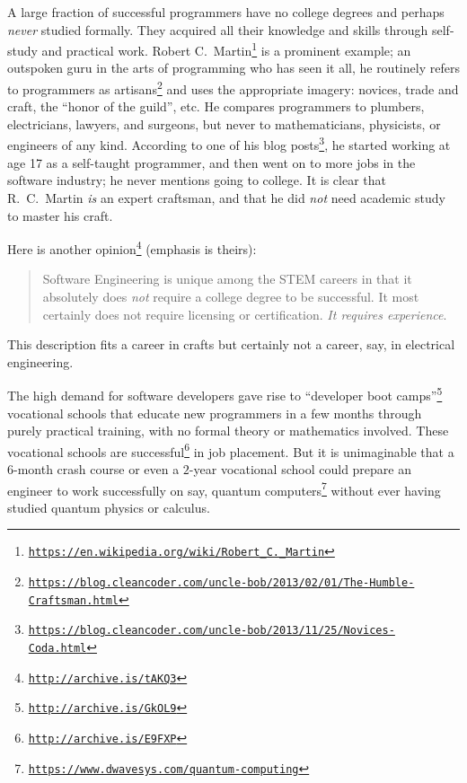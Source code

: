 A large fraction of successful programmers have no college degrees
and perhaps \emph{never} studied formally. They acquired all their
knowledge and skills through self-study and practical work. Robert
C.~Martin\footnote{\texttt{\href{https://en.wikipedia.org/wiki/Robert_C._Martin}{https://en.wikipedia.org/wiki/Robert\_C.\_Martin}}}
is a prominent example; an outspoken guru in the arts of programming
who has seen it all, he routinely refers to programmers as artisans\footnote{\texttt{\href{https://blog.cleancoder.com/uncle-bob/2013/02/01/The-Humble-Craftsman.html}{https://blog.cleancoder.com/uncle-bob/2013/02/01/The-Humble-Craftsman.html}}}
and uses the appropriate imagery: novices, trade and craft, the ``honor
of the guild'', etc. He compares programmers to plumbers, electricians,
lawyers, and surgeons, but never to mathematicians, physicists, or
engineers of any kind. According to one of his blog posts\footnote{\texttt{\href{https://blog.cleancoder.com/uncle-bob/2013/11/25/Novices-Coda.html}{https://blog.cleancoder.com/uncle-bob/2013/11/25/Novices-Coda.html}}},
he started working at age 17 as a self-taught programmer, and then
went on to more jobs in the software industry; he never mentions going
to college. It is clear that R.~C.~Martin \emph{is} an expert craftsman,
and that he did \emph{not} need academic study to master his craft.

Here is another opinion\footnote{\texttt{\href{http://archive.is/tAKQ3}{http://archive.is/tAKQ3}}}
(emphasis is theirs):
\begin{quotation}
{\small{}Software Engineering is unique among the STEM careers in
that it absolutely does }\emph{\small{}not}{\small{} require a college
degree to be successful. It most certainly does not require licensing
or certification. }\emph{\small{}It requires experience}{\small{}.}{\small\par}
\end{quotation}
This description fits a career in crafts \textemdash{} but certainly
not a career, say, in electrical engineering.

The high demand for software developers gave rise to ``developer
boot camps''\footnote{\texttt{\href{http://archive.is/GkOL9}{http://archive.is/GkOL9}}}
\textemdash{} vocational schools that educate new programmers in a
few months through purely practical training, with no formal theory
or mathematics involved. These vocational schools are successful\footnote{\texttt{\href{http://archive.is/E9FXP}{http://archive.is/E9FXP}}}
in job placement. But it is unimaginable that a $6$-month crash course
or even a $2$-year vocational school could prepare an engineer to
work successfully on say, quantum computers\footnote{\texttt{\href{https://www.dwavesys.com/quantum-computing}{https://www.dwavesys.com/quantum-computing}}}
without ever having studied quantum physics or calculus.

